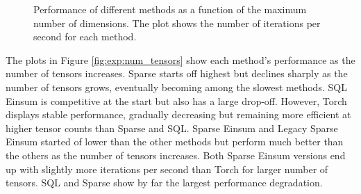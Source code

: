 \begin{figure}[H]
    \caption{Performance of different methods as a function of the maximum number of dimensions. The plot shows the number of iterations per second for each method.}
    \label{fig:exp:max_num_dim}
\end{figure}

\noindent
The plots in Figure \ref{fig:exp:num_tensors} show each method's performance as the number 
of tensors increases. Sparse starts off highest but declines sharply as the number of tensors 
grows, eventually becoming among the slowest methods. SQL Einsum is competitive at the start 
but also has a large drop-off. However, Torch displays stable performance, gradually 
decreasing but remaining more efficient at higher tensor counts than Sparse and SQL. 
Sparse Einsum and Legacy Sparse Einsum started of lower than the other methods but perform 
much better than the others as the number of tensors increases. Both Sparse Einsum versions 
end up with slightly more iterations per second than Torch for larger number of tensors. 
SQL and Sparse show by far the largest performance degradation.

